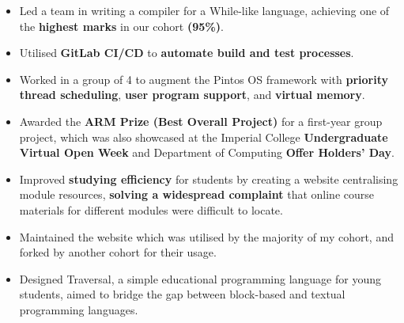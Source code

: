 \documentclass[10pt]{article}
\begin{document}
\begin{itemize}
  \item Led a team in writing a compiler for a While-like language, achieving one of the \textbf{highest marks} in our cohort \textbf{(95\%)}.
  \item Utilised \textbf{GitLab CI/CD} to \textbf{automate build and test processes}.
\end{itemize}
\entrysep

\begin{itemize}
  \item Worked in a group of 4 to augment the Pintos OS framework with \textbf{priority thread scheduling}, \textbf{user program support}, and \textbf{virtual memory}.
\end{itemize}
\entrysep

\begin{itemize}
  \item Awarded the \textbf{ARM Prize (Best Overall Project)} for a first-year group project, which was also showcased at the Imperial College \textbf{Undergraduate Virtual Open Week} and Department of Computing \textbf{Offer Holders' Day}.
\end{itemize}
\entrysep

\begin{itemize}
  \item Improved \textbf{studying efficiency} for students by creating a website centralising module resources, \textbf{solving a widespread complaint} that online course materials for different modules were difficult to locate.
  \item Maintained the website which was utilised by the majority of my cohort, and forked by another cohort for their usage.
\end{itemize}
\entrysep

\begin{itemize}
  \item Designed Traversal, a simple educational programming language for young students, aimed to bridge the gap between block-based and textual programming languages.
\end{itemize}
\end{document}
